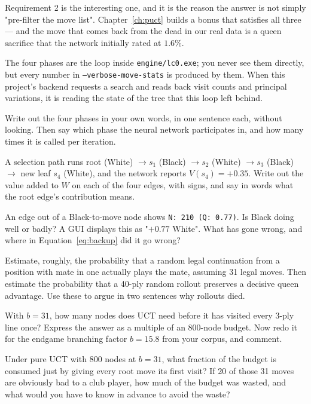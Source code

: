 Requirement 2 is the interesting one, and it is the reason the answer is not simply
"pre-filter the move list". Chapter~\ref{ch:puct} builds a bonus that satisfies all three ---
and the move that comes back from the dead in our real data is a queen sacrifice that the
network initially rated at $1.6\%$.

\begin{repobox}[title={in this repository}]
The four phases are the loop inside \texttt{engine/lc0.exe}; you never see them directly, but
every number in \texttt{--verbose-move-stats} is produced by them. When this project's
backend requests a search and reads back visit counts and principal variations, it is reading
the state of the tree that this loop left behind.
\end{repobox}

\begin{exercises}

 Write out the four phases in your own words, in one sentence
each, without looking. Then say which phase the neural network participates in, and how many
times it is called per iteration.

 A selection path runs root (White) $\to s_1$ (Black)
$\to s_2$ (White) $\to s_3$ (Black) $\to$ new leaf $s_4$ (White), and the network reports
$V(s_4) = +0.35$. Write out the value added to $W$ on each of the four edges, with signs, and
say in words what the root edge's contribution means.

 An edge out of a Black-to-move node shows
\texttt{N: 210 (Q: 0.77)}. Is Black doing well or badly? A GUI displays this as "$+0.77$
White". What has gone wrong, and where in Equation~\eqref{eq:backup} did it go wrong?

 Estimate, roughly, the probability that a random legal
continuation from a position with mate in one actually plays the mate, assuming 31 legal
moves. Then estimate the probability that a 40-ply random rollout preserves a decisive queen
advantage. Use these to argue in two sentences why rollouts died.

 With $b = 31$, how many nodes does UCT need before it has
visited every 3-ply line once? Express the answer as a multiple of an 800-node budget. Now
redo it for the endgame branching factor $b = 15.8$ from your corpus, and comment.

 Under pure UCT with 800 nodes at $b=31$, what
fraction of the budget is consumed just by giving every root move its first visit? If 20 of
those 31 moves are obviously bad to a club player, how much of the budget was wasted, and
what would you have to know in advance to avoid the waste?


\end{exercises}
